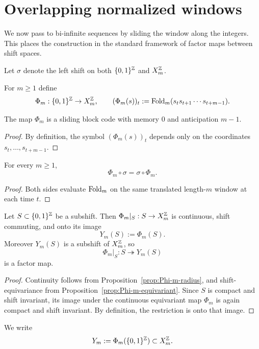 \section{Overlapping normalized windows}

We now pass to bi-infinite sequences by sliding the window along the integers.
This places the construction in the standard framework of factor maps between
shift spaces.

Let $\sigma$ denote the left shift on both $\{0,1\}^{\mathbb{Z}}$ and $X_m^{\mathbb{Z}}$.

\begin{definition}
\label{def:Phi-m}
For $m\ge 1$ define
\[
\Phi_m:\{0,1\}^{\mathbb{Z}}\to X_m^{\mathbb{Z}},
\qquad
(\Phi_m(s))_t:=\operatorname{Fold}_m(s_t s_{t+1}\cdots s_{t+m-1}).
\]
\end{definition}

\begin{proposition}
\label{prop:Phi-m-radius}
The map $\Phi_m$ is a sliding block code with memory $0$ and anticipation
$m-1$.
\end{proposition}

\begin{proof}
By definition, the symbol $(\Phi_m(s))_t$ depends only on the coordinates
$s_t,\ldots,s_{t+m-1}$.
\end{proof}

\begin{proposition}
\label{prop:Phi-m-equivariant}
For every $m\ge 1$,
\[
\Phi_m\circ \sigma=\sigma\circ \Phi_m.
\]
\end{proposition}

\begin{proof}
Both sides evaluate $\operatorname{Fold}_m$ on the same translated length-$m$ window at each
time $t$.
\end{proof}

\begin{proposition}
\label{prop:Phi-m-factor}
Let $S\subset \{0,1\}^{\mathbb{Z}}$ be a subshift.  Then $\Phi_m|_S:S\to X_m^{\mathbb{Z}}$ is
continuous, shift commuting, and onto its image
\[
Y_m(S):=\Phi_m(S).
\]
Moreover $Y_m(S)$ is a subshift of $X_m^{\mathbb{Z}}$, so
\[
\Phi_m|_S:S\twoheadrightarrow Y_m(S)
\]
is a factor map.
\end{proposition}

\begin{proof}
Continuity follows from Proposition~\ref{prop:Phi-m-radius}, and
shift-equivariance from Proposition~\ref{prop:Phi-m-equivariant}.  Since $S$ is
compact and shift invariant, its image under the continuous equivariant map
$\Phi_m$ is again compact and shift invariant.  By definition, the restriction
is onto that image.
\end{proof}

\begin{definition}
\label{def:Y-m}
We write
\[
Y_m:=\Phi_m(\{0,1\}^{\mathbb{Z}})\subset X_m^{\mathbb{Z}}.
\]
\end{definition}

